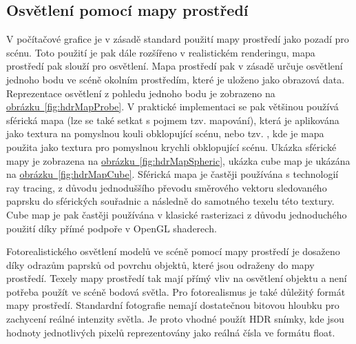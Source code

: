 \documentclass[czech,master]{diploma}
\begin{document}
\subsection{Osvětlení pomocí mapy prostředí}
V počítačové grafice je v zásadě standard použití mapy prostředí jako pozadí pro scénu. Toto použití je pak dále rozšířeno v realistickém renderingu, mapa prostředí pak slouží pro osvětlení. Mapa prostředí pak v zásadě určuje osvětlení jednoho bodu ve scéně okolním prostředím, které je uloženo jako obrazová data. Reprezentace osvětlení z pohledu jednoho bodu je zobrazeno na \hyperref[fig:hdrMapProbe]{obrázku~\ref{fig:hdrMapProbe}}. V praktické implementaci se pak většinou používá sférická mapa (lze se také setkat s pojmem tzv.  mapování), která je aplikována jako textura na pomyslnou kouli obklopující scénu, nebo tzv. , kde je mapa použita jako textura pro pomyslnou krychli obklopující scénu. Ukázka sférické mapy je zobrazena na \hyperref[fig:hdrMapSpheric]{obrázku~\ref{fig:hdrMapSpheric}}, ukázka cube map je ukázána na \hyperref[fig:hdrMapCube]{obrázku~\ref{fig:hdrMapCube}}. Sférická mapa je častěji používána s technologií ray tracing, z důvodu jednoduššího převodu směrového vektoru sledovaného paprsku do sférických souřadnic a následně do samotného texelu této textury. Cube map je pak častěji používána v klasické rasterizaci z důvodu jednoduchého použití díky přímé podpoře v OpenGL shaderech.\par
Fotorealistického osvětlení modelů ve scéně pomocí mapy prostředí je dosaženo díky odrazům paprsků od povrchu objektů, které jsou odraženy do mapy prostředí. Texely mapy prostředí tak mají přímý vliv na osvětlení objektu a není potřeba použít ve scéně bodová světla. Pro fotorealismus je také důležitý formát mapy prostředí. Standardní fotografie nemají dostatečnou bitovou hloubku pro zachycení reálné intenzity světla. Je proto vhodné použít HDR snímky, kde jsou hodnoty jednotlivých pixelů reprezentovány jako reálná čísla ve formátu float.
\end{document}
